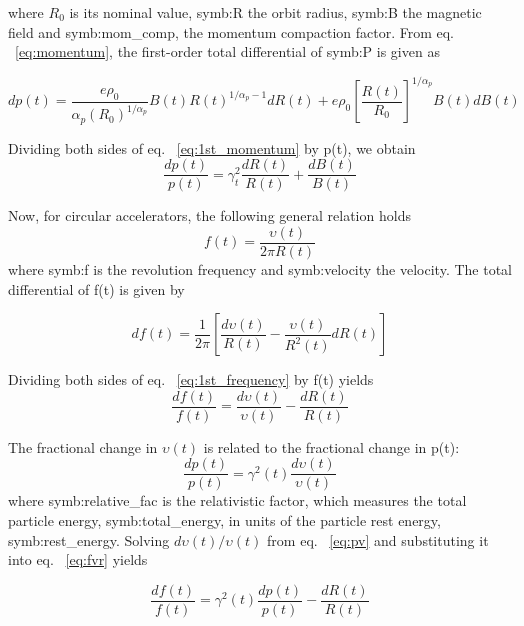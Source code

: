 where $R_0$ is its nominal value, \gls{symb:R} the orbit radius, \gls{symb:B} the magnetic field and \gls{symb:mom_comp}, the momentum compaction factor. From eq. ~\ref{eq:momentum}, the first-order total differential of \gls{symb:P} is given as

\begin{equation}
\label{eq:1st_momentum}
dp(t)=\frac{e\rho_0}{\alpha_p (R_0)^{1/\alpha_p}}B(t)R(t)^{1/\alpha_p-1}dR(t)+ e\rho_0 [\frac {R(t)}{R_0}]^{1/\alpha_p }B(t)dB(t) 
\end{equation}

Dividing both sides of eq. ~\ref{eq:1st_momentum} by p(t), we obtain
\begin{equation}
\label{eq:pRB}
\frac{dp(t)}{p(t)}={\gamma_t^2}\frac{dR(t)}{R(t)}+\frac{dB(t)}{B(t)} 
\end{equation}

Now, for circular accelerators, the following general relation holds
\begin{equation}
\label{eq:frequency}
f(t)=\frac{\upsilon(t)}{2\pi R(t)} 
\end{equation}
where \gls{symb:f} is the revolution frequency and \gls{symb:velocity} the velocity. The total differential of f(t) is given by

\begin{equation}
\label{eq:1st_frequency}
df(t)=\frac{1}{2\pi}[\frac{d\upsilon(t)}{R(t)}- \frac{\upsilon(t)}{R^2(t)}dR(t)]
\end{equation}

Dividing both sides of eq. ~\ref{eq:1st_frequency} by f(t) yields
\begin{equation}
\label{eq:fvr}
\frac{df(t)}{f(t)}=\frac{d\upsilon(t)}{\upsilon(t)}- \frac{dR(t)}{R(t)}
\end{equation}

The fractional change in $\upsilon(t)$ is related to the fractional change in p(t):
\begin{equation}
\label{eq:pv}
\frac{dp(t)}{p(t)}=\gamma^2(t)\frac{d\upsilon(t)}{\upsilon(t)}
\end{equation}
where \gls{symb:relative_fac} is the relativistic factor, which measures the total particle energy, \gls{symb:total_energy}, in units of the particle rest energy, \gls{symb:rest_energy}. Solving $d\upsilon(t)/\upsilon(t)$ from eq. ~\ref{eq:pv} and substituting it into eq. ~\ref{eq:fvr} yields

\begin{equation}
\label{eq:fPR}
\frac{df(t)}{f(t)} ={\gamma^2(t)}\frac{dp(t)}{p(t)}-\frac{dR(t)}{R(t)} 
\end{equation}

